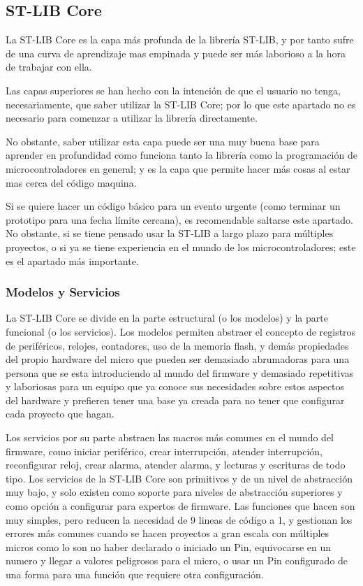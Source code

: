 \documentclass{report}
\begin{document}
\subsection{ST-LIB Core}
La ST-LIB Core es la capa más profunda de la librería ST-LIB, y por tanto sufre de una curva de aprendizaje mas empinada y puede ser más laborioso a la hora de trabajar con ella. 
\par
Las capas superiores se han hecho con la intención de que el usuario no tenga, necesariamente, que saber utilizar la ST-LIB Core; por lo que este apartado no es necesario para comenzar a utilizar la librería directamente. 
\par \vspace{0.3cm}
No obstante, saber utilizar esta capa puede ser una muy buena base para aprender en profundidad como funciona tanto la librería como la programación de microcontroladores en general; y es la capa que permite hacer más cosas al estar mas cerca del código maquina. \par \vspace{0.3cm}
Si se quiere hacer un código básico para un evento urgente (como terminar un prototipo para una fecha límite cercana), es recomendable saltarse este apartado. No obstante, si se tiene pensado usar la ST-LIB a largo plazo para múltiples proyectos, o si ya se tiene experiencia en el mundo de los microcontroladores; este es el apartado más importante. 

\subsubsection{Modelos y Servicios}
La ST-LIB Core se divide en la parte estructural (o los modelos) y la parte funcional (o los servicios). Los modelos permiten abstraer el concepto de registros de periféricos, relojes, contadores, uso de la memoria flash, y demás propiedades del propio hardware del micro que pueden ser demasiado abrumadoras para una persona que se esta introduciendo al mundo del firmware y demasiado repetitivas y laboriosas para un equipo que ya conoce sus necesidades sobre estos aspectos del hardware y prefieren tener una base ya creada para no tener que configurar cada proyecto que hagan. \par \vspace{0.3 cm}

Los servicios por su parte abstraen las macros más comunes en el mundo del firmware, como iniciar periférico, crear interrupción, atender interrupción, reconfigurar reloj, crear alarma, atender alarma, y lecturas y escrituras de todo tipo. Los servicios de la ST-LIB Core son primitivos y de un nivel de abstracción muy bajo, y solo existen como soporte para niveles de abstracción superiores y como opción a configurar para expertos de firmware. Las funciones que hacen son muy simples, pero reducen la necesidad de 9 lineas de código a 1, y gestionan los errores más comunes cuando se hacen proyectos a gran escala con múltiples micros como lo son no haber declarado o iniciado un Pin, equivocarse en un numero y llegar a valores peligrosos para el micro, o usar un Pin configurado de una forma para una función que requiere otra configuración. \par \vspace{0.3 cm}
\end{document}
